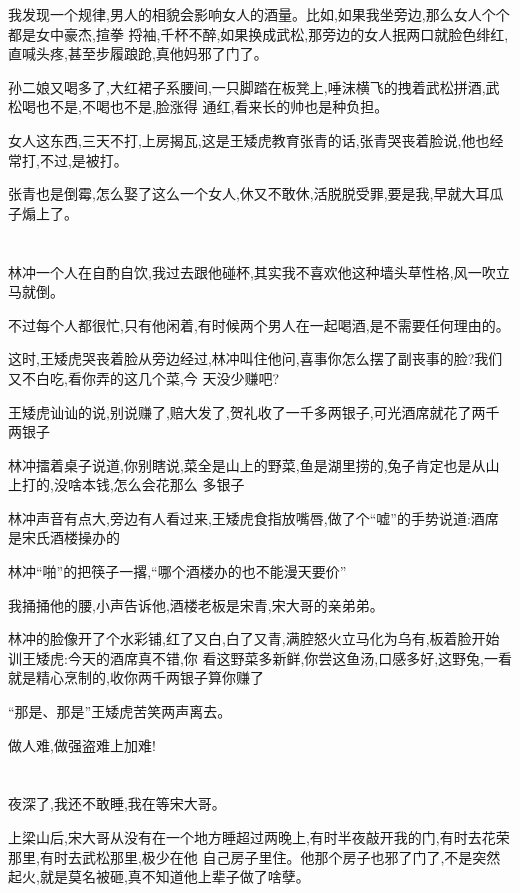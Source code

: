 ﻿\documentclass[12pt]{article}
\begin{document}
我发现一个规律,男人的相貌会影响女人的酒量。比如,如果我坐旁边,那么女人个个都是女中豪杰,揎拳
捋袖,千杯不醉,如果换成武松,那旁边的女人抿两口就脸色绯红,直喊头疼,甚至步履踉跄,真他妈邪了门了。

孙二娘又喝多了,大红裙子系腰间,一只脚踏在板凳上,唾沫横飞的拽着武松拼酒,武松喝也不是,不喝也不是,脸涨得
通红,看来长的帅也是种负担。

女人这东西,三天不打,上房揭瓦,这是王矮虎教育张青的话,张青哭丧着脸说,他也经常打,不过,是被打。

张青也是倒霉,怎么娶了这么一个女人,休又不敢休,活脱脱受罪,要是我,早就大耳瓜子煽上了。

\section{}

林冲一个人在自酌自饮,我过去跟他碰杯,其实我不喜欢他这种墙头草性格,风一吹立马就倒。

不过每个人都很忙,只有他闲着,有时候两个男人在一起喝酒,是不需要任何理由的。

这时,王矮虎哭丧着脸从旁边经过,林冲叫住他问,喜事你怎么摆了副丧事的脸?我们又不白吃,看你弄的这几个菜,今
天没少赚吧?

王矮虎讪讪的说,别说赚了,赔大发了,贺礼收了一千多两银子,可光酒席就花了两千两银子

林冲擂着桌子说道,你别瞎说,菜全是山上的野菜,鱼是湖里捞的,兔子肯定也是从山上打的,没啥本钱,怎么会花那么
多银子

林冲声音有点大,旁边有人看过来,王矮虎食指放嘴唇,做了个``嘘''的手势说道:酒席是宋氏酒楼操办的

林冲``啪''的把筷子一撂,``哪个酒楼办的也不能漫天要价''

我捅捅他的腰,小声告诉他,酒楼老板是宋青,宋大哥的亲弟弟。

林冲的脸像开了个水彩铺,红了又白,白了又青,满腔怒火立马化为乌有,板着脸开始训王矮虎:今天的酒席真不错,你
看这野菜多新鲜,你尝这鱼汤,口感多好,这野兔,一看就是精心烹制的,收你两千两银子算你赚了\dldots

``那是、那是''王矮虎苦笑两声离去。

做人难,做强盗难上加难!

\section{}

夜深了,我还不敢睡,我在等宋大哥。

上梁山后,宋大哥从没有在一个地方睡超过两晚上,有时半夜敲开我的门,有时去花荣那里,有时去武松那里,极少在他
自己房子里住。他那个房子也邪了门了,不是突然起火,就是莫名被砸,真不知道他上辈子做了啥孽。
\end{document}
